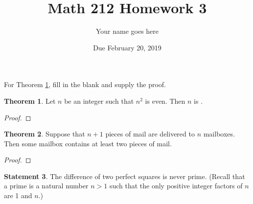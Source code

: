 \documentclass[11pt]{article}		%
\title{Math 212 Homework 3}
\author{Your name goes here}
\date{Due February 20, 2019}
\theoremstyle{definition}
\newtheorem{theorem}{Theorem}
\newtheorem{statement}[theorem]{Statement}
\begin{document}
\maketitle


\noindent For Theorem \ref{Theorem:ThisIsHowLabelsWork}, fill in the blank and supply the proof.

\begin{theorem}\label{Theorem:ThisIsHowLabelsWork}
	Let $n$ be an integer such that $n^2$ is even.
	Then $n$ is \makebox[0.75in]{\hrulefill}.
\end{theorem}

\begin{proof}

\end{proof}

\begin{theorem}
	Suppose that $n+1$ pieces of mail are delivered to $n$ mailboxes.
	Then some mailbox contains at least two pieces of mail. %
\end{theorem}

\begin{proof}

\end{proof}



\begin{statement} %
	The difference of two perfect squares is never prime. (Recall that a prime is a natural number $n> 1$ such that the only positive integer factors of $n$ are 1 and $n$.)
\end{statement}
\end{document}
